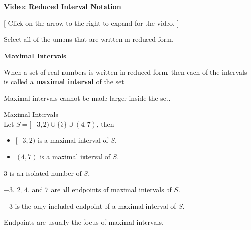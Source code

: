 \documentclass{ximera}
\begin{document}


\begin{onlineOnly}
\begin{explanation} \textbf{\textcolor{red!75!green}{Video: Reduced Interval Notation}}

[ Click on the arrow to the right to expand for the video. ]
\begin{expandable} 

\begin{center}
\end{center}

\end{expandable}

\end{explanation}
\end{onlineOnly}





\begin{question}

Select all of the unions that are written in reduced form.
  \begin{selectAll}
  \choice {$[-3, 4) \cup (2, 7)$}
  \choice {$(-3, 2] \cup [4, 7] \cup \{ 3 \}$}
  \choice [correct]{$[-3, 2) \cup \{ 3 \} \cup (4, 7)$}
  \choice {$(4, 7) \cup [-3, 2)$}
  \end{selectAll}
\end{question}




\begin{definition} \textbf{\textcolor{green!50!black}{Maximal Intervals}}

When a set of real numbers is written in reduced form, then each of the intervals is called a \textbf{maximal interval} of the set.
\end{definition}
Maximal intervals cannot be made larger inside the set.  


\begin{example} Maximal Intervals \\
Let $S = [-3, 2) \cup \{ 3 \} \cup (4, 7)$, then

\begin{itemize}
\item $[-3, 2)$ is a maximal interval of $S$.
\item $(4, 7)$ is a maximal interval of $S$.
\end{itemize}


$3$ is an isolated number of $S$, 

$-3$, $2$, $4$, and $7$ are all endpoints of maximal intervals of $S$. 

$-3$ is the only included endpoint of a maximal interval of $S$.



\end{example}
Endpoints are usually the focus of maximal intervals.
\end{document}
